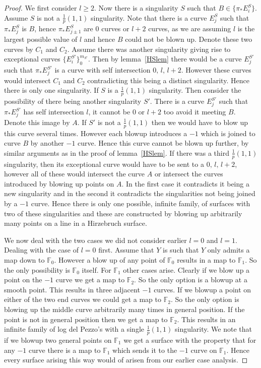 \documentclass[11pt]{amsbook}
\theoremstyle{definition}
\theoremstyle{definition}
\theoremstyle{definition}
\theoremstyle{definition}
\theoremstyle{definition}
\theoremstyle{definition}
\theoremstyle{definition}
\theoremstyle{definition}
\newcommand{\ldp}{log del Pezzo}
\newcommand{\mb}[1]{\mathbb{#1}}
\begin{document}
\begin{proof}
We first consider $l\geq 2$. Now there is a singularity $S$ such that $B \in \{ \pi_*E_i^S \}$. Assume $S$ is not a $\frac{1}{p}(1,1)$ singularity. Note that there is a curve $E_j^S$ such that $\pi_* E_j^S$ is $B$, hence $\pi_*E_{j\pm 1}^S$ are $0$ curves or $l+2$ curves, as we are assuming $l$ is the largest possible value of $l$ and hence $B$ could not be blown up. Denote these two curves by $C_1$ and $C_2$. Assume there was another singularity giving rise to exceptional curves $\{ E_i^{S'} \}_{0}^{m_{S'}} $. Then by lemma~\ref{HSlem} there would be a curve $E_j^{S'}$ such that $\pi_* E_j^{S'}$ is a curve with self intersection $0, \,  l,\,  l+2$. However these curves would intersect $C_1$ and $C_2$ contradicting this being a distinct singularity. Hence there is only one singularity. If $S$ is a $\frac{1}{p}(1,1)$ singularity. Then consider the possibility of there being another singularity $S'$. There is a curve $E_j^{S'}$ such that $\pi_* E_j^{S'}$ has self intersection $l$, it cannot be $0$ or $l+2$ too avoid it meeting $B$. Denote this image by $A$. If $S'$ is not a $\frac{1}{p}(1,1)$ then we would have to blow up this curve several times. However each blowup introduces a $-1$ which is joined to curve $B$ by another $-1$ curve. Hence this curve cannot be blown up further, by similar arguments as in the proof of lemma~\ref{HSlem}. If there was a third $\frac{1}{p}(1,1)$ singularity, then its exceptional curve would have to be sent to a $0, \, l, \, l+2$, however all of these would intersect the curve $A$ or intersect the curves introduced by blowing up points on $A$. In the first case it contradicts it being a new singularity and in the second it contradicts the singularities not being joined by a $-1$ curve. Hence there is only one possible, infinite family, of surfaces with two of these singularities and these are constructed by blowing up arbitrarily many points on a line in a Hirzebruch surface.



We now deal with the two cases we did not consider earlier $l = 0$ and $l =1$. Dealing with the case of $l = 0$ first. Assume that $Y$ is such that $Y$ only admits a map down to $\mb{F}_0$. However a blow up of any point of $\mb{F}_0$ results in a map to $\mb{F}_1$. So the only possibility is $\mb{F}_0$ itself. For $\mb{F}_1$ other cases arise. Clearly if we blow up a point on the $-1$ curve we get a map to $\mb{F}_2$. So the only option is a blowup at a smooth point. This results in three adjacent $-1$ curves. If we blowup a point on either of the two end curves we could get a map to $\mb{F}_2$. So the only option is blowing up the middle curve arbitrarily many times in general position. If the point is not in general position then we get a map to $\mb{F}_2$. This results in an infinite family of \ldp's with a single $\frac{1}{p}(1,1)$ singularity. We note that if we blowup two general points on $\mb{F}_1$ we get a surface with the property that for any $-1$ curve there is a map to $\mb{F}_1$ which sends it to the $-1$ curve on $\mb{F}_1$. Hence every surface arising this way would of arisen from our earlier case analysis.




\end{proof}
\end{document}
